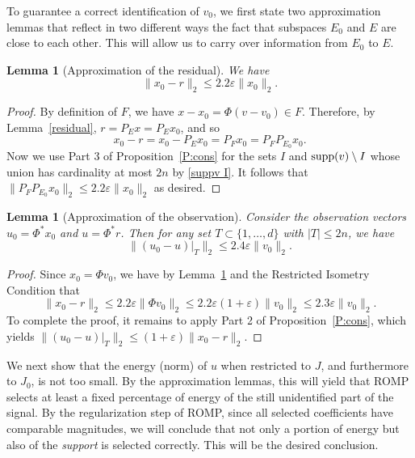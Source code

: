 \documentclass[12pt]{amsart}
\theoremstyle{plain}
\newtheorem{lemma}[theorem]{Lemma}
\theoremstyle{definition}
\theoremstyle{remark}
\numberwithin{equation}{section}
\begin{document}
To guarantee a correct identification of $v_0$, we first state
two approximation lemmas that reflect in two different ways the fact 
that subspaces $E_0$ and $E$ are close to each other.
This will allow us to carry over information from $E_0$ to $E$.

\begin{lemma}[Approximation of the residual]\label{C:proj}
  We have
  $$
  \|x_0 - r\|_2 \leq 2.2 {\varepsilon} \|x_0\|_2.
  $$
\end{lemma}

\begin{proof}
By definition of $F$, we have 
$x - x_0 = \Phi(v - v_0) \in F$. 
Therefore, by Lemma~\ref{residual},
$r = P_{E}x = P_{E}x_0$, and so
$$
x_0 - r = x_0 - P_Ex_0 = P_Fx_0 = P_FP_{E_0}x_0.
$$
Now we use Part 3 of Proposition~\ref{P:cons} for the sets $I$ and ${{\rm supp}}(v) \setminus I$
whose union has cardinality at most $2n$ by \eqref{suppv I}. It follows that
$\|P_FP_{E_0}x_0\|_2 \le 2.2 {\varepsilon} \|x_0\|_2$ as desired.
\end{proof}

\begin{lemma}[Approximation of the observation]\label{L:uj}
  Consider the observation vectors 
  $u_0 = \Phi^*x_0$ and $u = \Phi^*r$. Then for any set $T \subset \{1, \ldots, d\}$ with $|T| \le 2n$, we have
  $$
  \|(u_0 - u)|_T\|_2 \leq 2.4 {\varepsilon} \|v_0\|_2.
  $$
\end{lemma}

\begin{proof}
Since $x_0 = \Phi v_0$, we have by Lemma~\ref{C:proj} 
and the Restricted Isometry Condition that
$$
\|x_0 - r\|_2 
\le 2.2 {\varepsilon} \|\Phi v_0\|_2 
\le 2.2 {\varepsilon} (1+{\varepsilon}) \|v_0\|_2 
\le 2.3 {\varepsilon} \|v_0\|_2.
$$
To complete the proof, it remains to apply Part 2 of Proposition~\ref{P:cons},
which yields 
$\|(u_0 - u)|_T\|_2 \le (1 + {\varepsilon})\|x_0 - r\|_2$.
\end{proof}

We next show that the energy (norm) of $u$ when restricted to $J$, and furthermore to 
$J_0$, is not too small. By the approximation lemmas, this will yield that ROMP 
selects at least a fixed percentage of energy of the still unidentified part of the signal. 
By the regularization step of ROMP, since all selected coefficients have comparable
magnitudes, we will conclude that not only a portion of energy
but also of the {\em support} is selected correctly. This 
will be the desired conclusion.
\end{document}
